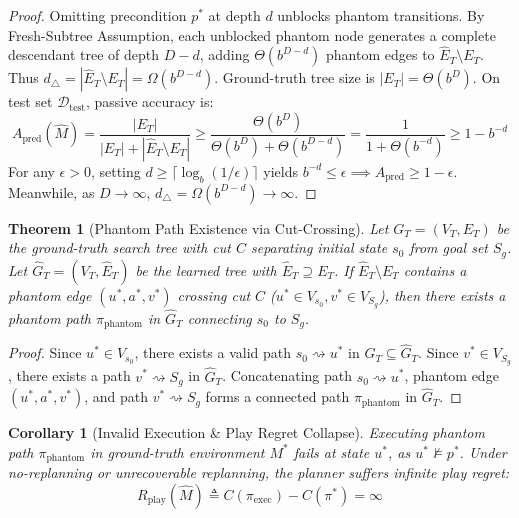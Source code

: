 \documentclass[preprint,12pt,3p]{elsarticle}
\newtheorem{theorem}{Theorem}
\newtheorem{corollary}{Corollary}
\begin{document}
\begin{proof}
Omitting precondition $p^*$ at depth $d$ unblocks phantom transitions. By Fresh-Subtree Assumption, each unblocked phantom node generates a complete descendant tree of depth $D-d$, adding $\Theta(b^{D-d})$ phantom edges to $\hat{E}_T \setminus E_T$. Thus $d_\triangle = |\hat{E}_T \setminus E_T| = \Omega(b^{D-d})$. Ground-truth tree size is $|E_T| = \Theta(b^D)$. On test set $\mathcal{D}_{\text{test}}$, passive accuracy is:
\begin{equation}
A_{\text{pred}}(\hat{M}) = \frac{|E_T|}{|E_T| + |\hat{E}_T \setminus E_T|} \ge \frac{\Theta(b^D)}{\Theta(b^D) + \Theta(b^{D-d})} = \frac{1}{1 + \Theta(b^{-d})} \ge 1 - b^{-d}
\end{equation}
For any $\epsilon > 0$, setting $d \ge \lceil \log_b(1/\epsilon) \rceil$ yields $b^{-d} \le \epsilon \implies A_{\text{pred}} \ge 1 - \epsilon$. Meanwhile, as $D \to \infty$, $d_\triangle = \Omega(b^{D-d}) \to \infty$.
\end{proof}

\begin{theorem}[Phantom Path Existence via Cut-Crossing]
Let $G_T = (V_T, E_T)$ be the ground-truth search tree with cut $C$ separating initial state $s_0$ from goal set $S_g$. Let $\hat{G}_T = (V_T, \hat{E}_T)$ be the learned tree with $\hat{E}_T \supseteq E_T$. If $\hat{E}_T \setminus E_T$ contains a phantom edge $(u^*, a^*, v^*)$ crossing cut $C$ ($u^* \in V_{s_0}, v^* \in V_{S_g}$), then there exists a phantom path $\pi_{\text{phantom}}$ in $\hat{G}_T$ connecting $s_0$ to $S_g$.
\end{theorem}

\begin{proof}
Since $u^* \in V_{s_0}$, there exists a valid path $s_0 \rightsquigarrow u^*$ in $G_T \subseteq \hat{G}_T$. Since $v^* \in V_{S_g}$, there exists a path $v^* \rightsquigarrow S_g$ in $\hat{G}_T$. Concatenating path $s_0 \rightsquigarrow u^*$, phantom edge $(u^*, a^*, v^*)$, and path $v^* \rightsquigarrow S_g$ forms a connected path $\pi_{\text{phantom}}$ in $\hat{G}_T$.
\end{proof}

\begin{corollary}[Invalid Execution \& Play Regret Collapse]
Executing phantom path $\pi_{\text{phantom}}$ in ground-truth environment $M^*$ fails at state $u^*$, as $u^* \not\models p^*$. Under no-replanning or unrecoverable replanning, the planner suffers infinite play regret:
\begin{equation}
R_{\text{play}}(\hat{M}) \triangleq C(\pi_{\text{exec}}) - C(\pi^*) = \infty
\end{equation}
\end{corollary}
\end{document}
